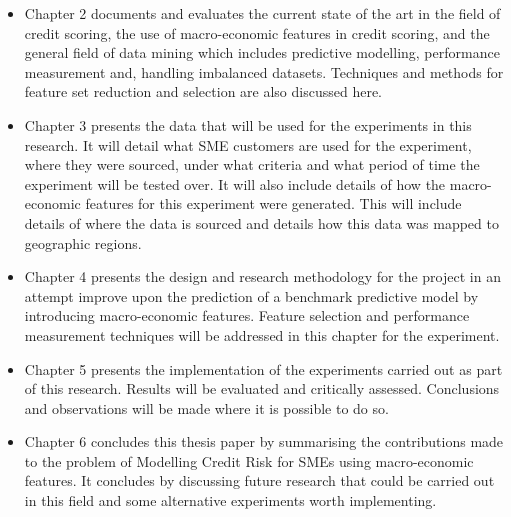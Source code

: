 \begin{itemize}
	
	\item Chapter 2 documents and evaluates the current state of the art in the field of credit scoring, the use of macro-economic features in credit scoring, and the general field of data mining which includes predictive modelling, performance measurement and, handling imbalanced datasets. Techniques and methods for feature set reduction and selection are also discussed here. 
	
	\item Chapter 3	presents the data that will be used for the experiments in this research. It will detail what SME customers are used for the experiment, where they were sourced, under what criteria and what period of time the experiment will be tested over. It will also include details of how the macro-economic features for this experiment were generated. This will include details of where the data is sourced and details how this data was mapped to geographic regions.  
	
	\item Chapter 4 presents the design and research methodology for the project in an attempt improve upon the prediction of a benchmark predictive model by introducing macro-economic features. Feature selection and performance measurement techniques will be addressed in this chapter for the experiment.
	
	\item Chapter 5 presents the implementation of the experiments carried out as part of this research. Results will be evaluated and critically assessed. Conclusions and observations will be made where it is possible to do so. 
	
	\item Chapter 6 concludes this thesis paper by summarising the contributions made to the problem of Modelling Credit Risk for SMEs using macro-economic features. It concludes by discussing future research that could be carried out in this field and some alternative experiments worth implementing.
	
\end{itemize}

